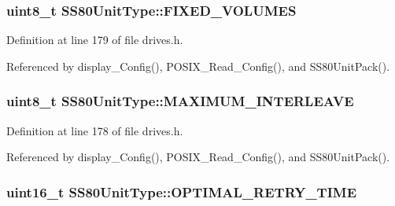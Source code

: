 \subsubsection[{\texorpdfstring{F\+I\+X\+E\+D\+\_\+\+V\+O\+L\+U\+M\+ES}{FIXED_VOLUMES}}]{\setlength{\rightskip}{0pt plus 5cm}uint8\+\_\+t S\+S80\+Unit\+Type\+::\+F\+I\+X\+E\+D\+\_\+\+V\+O\+L\+U\+M\+ES}\hypertarget{structSS80UnitType_ae1d52bfc5a9bdb8f6f26ba6dffd7c2f6}{}\label{structSS80UnitType_ae1d52bfc5a9bdb8f6f26ba6dffd7c2f6}


Definition at line 179 of file drives.\+h.



Referenced by display\+\_\+\+Config(), P\+O\+S\+I\+X\+\_\+\+Read\+\_\+\+Config(), and S\+S80\+Unit\+Pack().

\subsubsection[{\texorpdfstring{M\+A\+X\+I\+M\+U\+M\+\_\+\+I\+N\+T\+E\+R\+L\+E\+A\+VE}{MAXIMUM_INTERLEAVE}}]{\setlength{\rightskip}{0pt plus 5cm}uint8\+\_\+t S\+S80\+Unit\+Type\+::\+M\+A\+X\+I\+M\+U\+M\+\_\+\+I\+N\+T\+E\+R\+L\+E\+A\+VE}\hypertarget{structSS80UnitType_ab215c7a9a84d0d5003a2dcfbd18e4b7d}{}\label{structSS80UnitType_ab215c7a9a84d0d5003a2dcfbd18e4b7d}


Definition at line 178 of file drives.\+h.



Referenced by display\+\_\+\+Config(), P\+O\+S\+I\+X\+\_\+\+Read\+\_\+\+Config(), and S\+S80\+Unit\+Pack().

\subsubsection[{\texorpdfstring{O\+P\+T\+I\+M\+A\+L\+\_\+\+R\+E\+T\+R\+Y\+\_\+\+T\+I\+ME}{OPTIMAL_RETRY_TIME}}]{\setlength{\rightskip}{0pt plus 5cm}uint16\+\_\+t S\+S80\+Unit\+Type\+::\+O\+P\+T\+I\+M\+A\+L\+\_\+\+R\+E\+T\+R\+Y\+\_\+\+T\+I\+ME}\hypertarget{structSS80UnitType_ab7ae848f0a65aa2e29b613bc110c9085}{}\label{structSS80UnitType_ab7ae848f0a65aa2e29b613bc110c9085}


